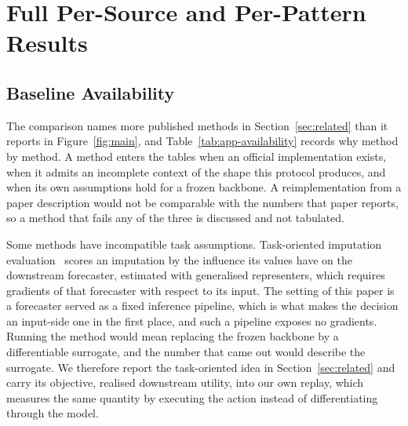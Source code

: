 \documentclass{article}
\begin{document}
\section{Full Per-Source and Per-Pattern Results}
\label{app:full-results}
\subsection{Baseline Availability}
\label{app:baseline-availability}
The comparison names more published methods in Section~\ref{sec:related} than it reports in
Figure~\ref{fig:main}, and Table~\ref{tab:app-availability} records why method by method. A
method enters the tables when an official implementation exists, when it admits an incomplete
context of the shape this protocol produces, and when its own assumptions hold for a frozen
backbone. A reimplementation from a paper description would not be comparable with the numbers
that paper reports, so a method that fails any of the three is discussed and not tabulated.

Some methods have incompatible task assumptions. Task-oriented imputation
evaluation~\citep{wang2024taskoriented} scores an imputation by the influence its values have
on the downstream forecaster, estimated with generalised representers, which requires gradients
of that forecaster with respect to its input. The setting of this paper is a forecaster served
as a fixed inference pipeline, which is what makes the decision an input-side one in the first
place, and such a pipeline exposes no gradients. Running the method would mean replacing the
frozen backbone by a differentiable surrogate, and the number that came out would describe the
surrogate. We therefore report the task-oriented idea in Section~\ref{sec:related} and carry
its objective, realised downstream utility, into our own replay, which measures the same
quantity by executing the action instead of differentiating through the model.
\end{document}
